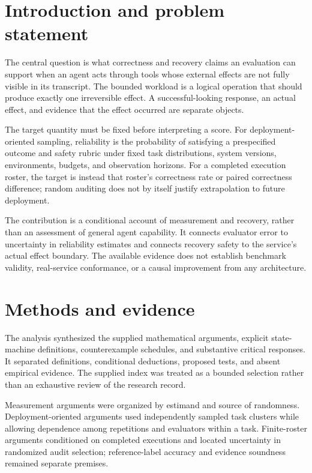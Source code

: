 \documentclass[11pt]{article}
\begin{document}
\section{Introduction and problem statement}
The central question is what correctness and recovery claims an evaluation can support when an agent acts through tools whose external effects are not fully visible in its transcript. The bounded workload is a logical operation that should produce exactly one irreversible effect. A successful-looking response, an actual effect, and evidence that the effect occurred are separate objects.

The target quantity must be fixed before interpreting a score. For deployment-oriented sampling, reliability is the probability of satisfying a prespecified outcome and safety rubric under fixed task distributions, system versions, environments, budgets, and observation horizons. For a completed execution roster, the target is instead that roster's correctness rate or paired correctness difference; random auditing does not by itself justify extrapolation to future deployment.

The contribution is a conditional account of measurement and recovery, rather than an assessment of general agent capability. It connects evaluator error to uncertainty in reliability estimates and connects recovery safety to the service's actual effect boundary. The available evidence does not establish benchmark validity, real-service conformance, or a causal improvement from any architecture.

\section{Methods and evidence}
The analysis synthesized the supplied mathematical arguments, explicit state-machine definitions, counterexample schedules, and substantive critical responses. It separated definitions, conditional deductions, proposed tests, and absent empirical evidence. The supplied index was treated as a bounded selection rather than an exhaustive review of the research record.

Measurement arguments were organized by estimand and source of randomness. Deployment-oriented arguments used independently sampled task clusters while allowing dependence among repetitions and evaluators within a task. Finite-roster arguments conditioned on completed executions and located uncertainty in randomized audit selection; reference-label accuracy and evidence soundness remained separate premises.
\end{document}
